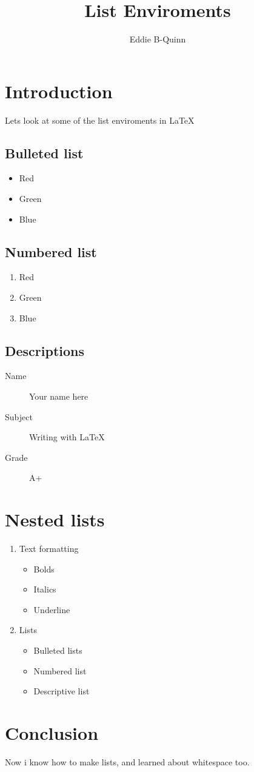 \documentclass{article}
\title{List Enviroments}
\author{Eddie B-Quinn}
\date{}
\begin{document}
\maketitle

\section{Introduction}
Lets look at some of the list enviroments in \LaTeX

\subsection{Bulleted list}
\begin{itemize}
    \item Red
    \item Green
    \item Blue
\end{itemize}

\subsection{Numbered list}
\begin{enumerate}
    \item Red
    \item Green
    \item Blue
\end{enumerate}

\subsection{Descriptions}
\begin{description}
    \item[Name] Your name here
    \item[Subject] Writing with \LaTeX
    \item[Grade] A+   
\end{description}

\section{Nested lists}
\begin{enumerate}
    \item Text formatting
    \begin{itemize}
        \item Bolds
        \item Italics
        \item Underline
    \end{itemize}
    \item Lists
    \begin{itemize}
        \item Bulleted lists
        \item Numbered list
        \item Descriptive list
    \end{itemize}
\end{enumerate}

\section{Conclusion}
Now i know how to make lists, and learned about whitespace too.
\end{document}
